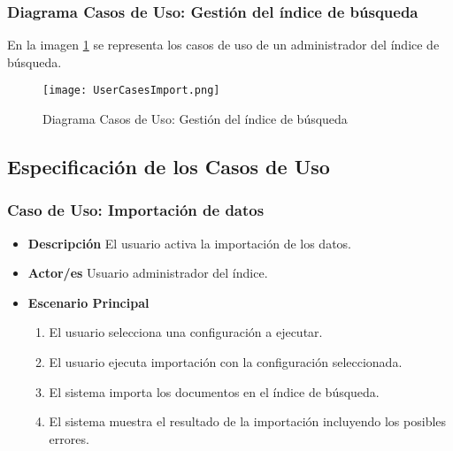 \subsubsection{Diagrama Casos de Uso: Gestión del índice de búsqueda}
En la imagen \ref{image:cuimport} se representa los casos de uso de un administrador del índice de búsqueda.

\begin{figure}[h!]
  \centering
     \texttt{[image: UserCasesImport.png]}
  \caption{Diagrama Casos de Uso: Gestión del índice de búsqueda}
  \label{image:cuimport}
\end{figure}

\subsection{Especificación de los Casos de Uso}

\subsubsection{Caso de Uso: Importación de datos}
\begin{itemize}
	\item{\textbf{Descripción}} El usuario activa la importación de los datos.
    \item{\textbf{Actor/es}} Usuario administrador del índice.
    \item{\textbf{Escenario Principal}}
    	\begin{enumerate}
        	\item El usuario selecciona una configuración a ejecutar.
			\item El usuario ejecuta importación con la configuración seleccionada.
            \item El sistema importa los documentos en el índice de búsqueda.
            \item El sistema muestra el resultado de la importación incluyendo los posibles errores.
        \end{enumerate}
\end{itemize}

